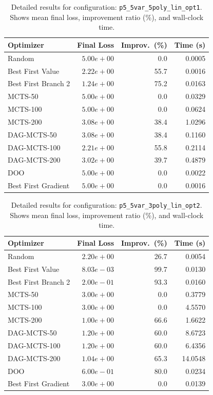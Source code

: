 \begin{table}[H]
\centering
\caption{Detailed results for configuration: \texttt{p5\_5var\_5poly\_lin\_opt1}. Shows mean final loss, improvement ratio (\%), and wall-clock time.}
\label{tab:abssum-detail-34}
\begin{tabular}{lrrr}
\toprule
Optimizer & Final Loss & Improv.~(\%) & Time (s) \\
\midrule
Random & $5.00e+00$ & 0.0 & 0.0005 \\
\hline
Best First Value & $2.22e+00$ & 55.7 & 0.0016 \\
\hline
Best First Branch 2 & \textbf{$1.24e+00$} & 75.2 & 0.0163 \\
\hline
MCTS-50 & $5.00e+00$ & 0.0 & 0.0329 \\
\hline
MCTS-100 & $5.00e+00$ & 0.0 & 0.0624 \\
\hline
MCTS-200 & $3.08e+00$ & 38.4 & 1.0296 \\
\hline
DAG-MCTS-50 & $3.08e+00$ & 38.4 & 0.1160 \\
\hline
DAG-MCTS-100 & $2.21e+00$ & 55.8 & 0.2114 \\
\hline
DAG-MCTS-200 & $3.02e+00$ & 39.7 & 0.4879 \\
\hline
DOO & $5.00e+00$ & 0.0 & 0.0022 \\
\hline
Best First Gradient & $5.00e+00$ & 0.0 & 0.0016 \\
\bottomrule
\end{tabular}
\end{table}

\begin{table}[H]
\centering
\caption{Detailed results for configuration: \texttt{p5\_5var\_3poly\_lin\_opt2}. Shows mean final loss, improvement ratio (\%), and wall-clock time.}
\label{tab:abssum-detail-35}
\begin{tabular}{lrrr}
\toprule
Optimizer & Final Loss & Improv.~(\%) & Time (s) \\
\midrule
Random & $2.20e+00$ & 26.7 & 0.0054 \\
\hline
Best First Value & \textbf{$8.03e-03$} & 99.7 & 0.0130 \\
\hline
Best First Branch 2 & $2.00e-01$ & 93.3 & 0.0160 \\
\hline
MCTS-50 & $3.00e+00$ & 0.0 & 0.3779 \\
\hline
MCTS-100 & $3.00e+00$ & 0.0 & 4.5570 \\
\hline
MCTS-200 & $1.00e+00$ & 66.6 & 1.6622 \\
\hline
DAG-MCTS-50 & $1.20e+00$ & 60.0 & 8.6723 \\
\hline
DAG-MCTS-100 & $1.20e+00$ & 60.0 & 6.4356 \\
\hline
DAG-MCTS-200 & $1.04e+00$ & 65.3 & 14.0548 \\
\hline
DOO & $6.00e-01$ & 80.0 & 0.0234 \\
\hline
Best First Gradient & $3.00e+00$ & 0.0 & 0.0139 \\
\bottomrule
\end{tabular}
\end{table}

